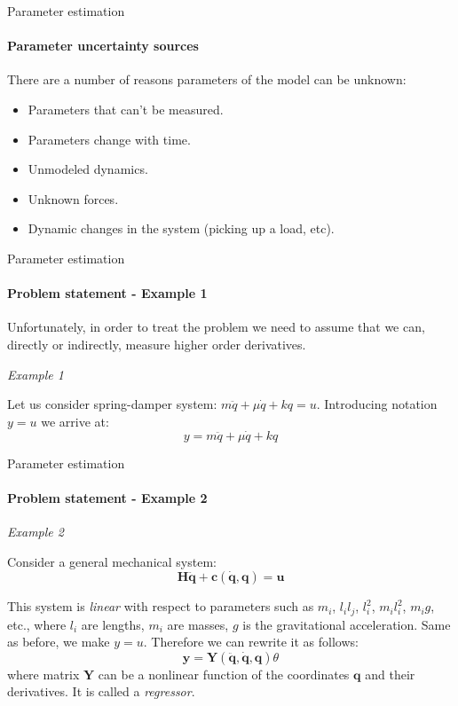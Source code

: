\documentclass{beamer}
\begin{document}
\begin{frame}{Parameter estimation}
\framesubtitle{Parameter uncertainty sources}
\begin{flushleft}

There are a number of reasons parameters of the model can be unknown:

\begin{itemize}
\item  Parameters that can’t be measured.
\item  Parameters change with time.
\item  Unmodeled dynamics.
\item  Unknown forces.
\item  Dynamic changes in the system (picking up a load, etc).
\end{itemize}

\end{flushleft}
\end{frame}


\begin{frame}{Parameter estimation}
\framesubtitle{Problem statement - Example 1}
\begin{flushleft}

Unfortunately, in order to treat the problem we need to assume that we can, directly or indirectly, measure higher order derivatives.

\bigskip

\emph{Example 1}

Let us consider spring-damper system: $m \ddot q + \mu \dot q + k q = u$. Introducing notation $y = u$ we arrive at:
\[
y = m \ddot q + \mu \dot q + k q
\]

\end{flushleft}
\end{frame}


\begin{frame}{Parameter estimation}
\framesubtitle{Problem statement - Example 2}
\begin{flushleft}

\emph{Example 2}

Consider a general mechanical system:
\[
\mathbf H \ddot {\mathbf q} + \mathbf c(\dot {\mathbf q}, \mathbf q) = \mathbf u
\]

This system is \emph{linear} with respect to parameters such as $m_i$, $l_i l_j$, $l_i^2$, $m_i l_i^2$, $m_i g$, etc., where $l_i$ are lengths, $m_i$ are masses, $g$ is the gravitational acceleration. Same as before, we make $y = u$. Therefore we can rewrite it as follows:
\[
\mathbf y = \mathbf Y (\ddot {\mathbf q}, \dot {\mathbf q}, \mathbf q) \theta
\]
where matrix $\mathbf Y$ can be a nonlinear function of the coordinates $\mathbf q$ and their derivatives. It is called a \emph{regressor}.


\end{flushleft}
\end{frame}
\end{document}

